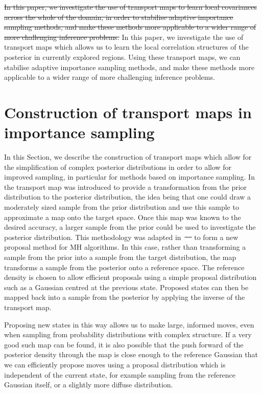 \documentclass[final]{siamltex}
\newcommand{\edit}[1]{{\color{red} #1}}  %
\providecommand{\DIFadd}[1]{{\protect\color{blue}\uwave{#1}}} %
\providecommand{\DIFdel}[1]{{\protect\color{red}\sout{#1}}}                      %
\providecommand{\DIFaddbegin}{} %
\providecommand{\DIFaddend}{} %
\providecommand{\DIFdelbegin}{} %
\providecommand{\DIFdelend}{} %
\newcommand{\DIFscaledelfig}{0.5}
\newlength{\DIFdelgraphicswidth} %
\newlength{\DIFdelgraphicsheight} %
\newcommand{\DIFaddincludegraphics}[2][]{{\color{blue}\fbox{\DIFOincludegraphics[#1]{#2}}}} %
\newcommand{\DIFdelincludegraphics}[2][]{%
\sbox{\DIFdelgraphicsbox}{\DIFOincludegraphics[#1]{#2}}%
\settoboxwidth{\DIFdelgraphicswidth}{\DIFdelgraphicsbox} %
\settoboxtotalheight{\DIFdelgraphicsheight}{\DIFdelgraphicsbox} %
\scalebox{\DIFscaledelfig}{%
\parbox[b]{\DIFdelgraphicswidth}{\usebox{\DIFdelgraphicsbox}\\[-\baselineskip] \rule{\DIFdelgraphicswidth}{0em}}\llap{\resizebox{\DIFdelgraphicswidth}{\DIFdelgraphicsheight}{%
\setlength{\unitlength}{\DIFdelgraphicswidth}%
\begin{picture}(1,1)%
\thicklines\linethickness{2pt} %
{\color[rgb]{1,0,0}\put(0,0){\framebox(1,1){}}}%
{\color[rgb]{1,0,0}\put(0,0){\line( 1,1){1}}}%
{\color[rgb]{1,0,0}\put(0,1){\line(1,-1){1}}}%
\end{picture}%
}\hspace*{3pt}}} %
} %
\DeclareRobustCommand{\DIFaddbegin}{\DIFOaddbegin \let\includegraphics\DIFaddincludegraphics} %
\DeclareRobustCommand{\DIFaddend}{\DIFOaddend \let\includegraphics\DIFOincludegraphics} %
\DeclareRobustCommand{\DIFdelbegin}{\DIFOdelbegin \let\includegraphics\DIFdelincludegraphics} %
\DeclareRobustCommand{\DIFdelend}{\DIFOaddend \let\includegraphics\DIFOincludegraphics} %
\begin{document}
\DIFdelbegin \DIFdel{In this paper, we investigate the use of transport maps to learn local
covariances across the whole of the domain, in order to stabilise
adaptive importance sampling methods, and make these methods more applicable to a wider
range of more challenging inference problems.
}\DIFdelend \DIFaddbegin \edit{In this paper, we investigate the use of transport maps which allows
us to learn the local correlation structures of the posterior in
currently explored regions. Using these transport maps, we can
stabilise adaptive importance sampling methods, and make these methods
more applicable to a wider range of more challenging inference problems.}
\DIFaddend 

\section{Construction of transport maps in importance sampling} \label{sec:map}
In this Section, we describe the construction of transport maps which
allow for the simplification of complex posterior distributions in
order to allow for improved sampling, in particular for methods based
on importance sampling.
In~\cite{el2012bayesian} the transport map was introduced to provide a transformation from the prior
distribution to the posterior distribution, the idea being that one could draw a moderately sized
sample from the prior distribution and use this sample to approximate a map onto the target space.
Once this map was known to the desired accuracy, a larger sample from the prior could be used to
investigate the posterior distribution. This
methodology was adapted in~\DIFdelbegin \DIFdel{\mbox{%
\cite{parno2014transport} }\hspace{0pt}%
}\DIFdelend \DIFaddbegin \DIFadd{\mbox{%
\cite{parno2018transport} }\hspace{0pt}%
}\DIFaddend to form a new proposal method for MH
algorithms. In this case, rather than transforming a sample from the prior into a sample from the target
distribution, the map transforms a sample from the posterior onto a reference space.
The reference density is chosen to allow efficient proposals using a simple proposal
distribution such as a Gaussian centred at the previous state. Proposed states can then be mapped back into a sample from the posterior by applying the inverse of the transport map.

Proposing new states in this way allows us to make large, informed
moves, even when sampling from probability distributions with complex structure.
If a very good such map can be found, it is also possible that the
push forward of the posterior density through the map is close enough
to the reference Gaussian that we can efficiently
propose moves using a proposal distribution which is independent of
the current state, for example sampling from the reference Gaussian
itself, or a slightly more diffuse distribution.
\end{document}
